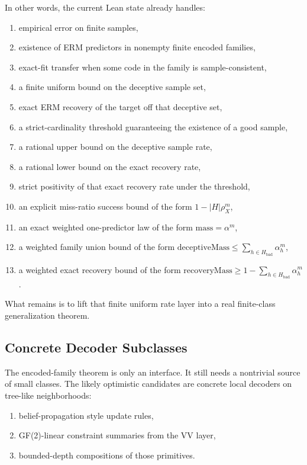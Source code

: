 \documentclass[11pt]{article}
\theoremstyle{remark}
\begin{document}
In other words, the current Lean state already handles:
\begin{enumerate}[leftmargin=1.5em]
  \item empirical error on finite samples,
  \item existence of ERM predictors in nonempty finite encoded families,
  \item exact-fit transfer when some code in the family is sample-consistent,
  \item a finite uniform bound on the deceptive sample set,
  \item exact ERM recovery of the target off that deceptive set,
  \item a strict-cardinality threshold guaranteeing the existence of a good sample,
  \item a rational upper bound on the deceptive sample rate,
  \item a rational lower bound on the exact recovery rate,
  \item strict positivity of that exact recovery rate under the threshold,
  \item an explicit miss-ratio success bound of the form \(1 - |H|\rho_X^m\),
  \item an exact weighted one-predictor law of the form \(\mathrm{mass} = \alpha^m\),
  \item a weighted family union bound of the form
  \(\mathrm{deceptiveMass} \le \sum_{h \in H_{\mathrm{bad}}}\alpha_h^m\),
  \item a weighted exact recovery bound of the form
  \(\mathrm{recoveryMass} \ge 1 - \sum_{h \in H_{\mathrm{bad}}}\alpha_h^m\).
\end{enumerate}

\noindent
What remains is to lift that finite uniform rate layer into a real finite-class
generalization theorem.

\subsection{Concrete Decoder Subclasses}

The encoded-family theorem is only an interface.  It still needs a nontrivial
source of small classes.  The likely optimistic candidates are concrete local
decoders on tree-like neighborhoods:
\begin{enumerate}[leftmargin=1.5em]
  \item belief-propagation style update rules,
  \item GF(2)-linear constraint summaries from the VV layer,
  \item bounded-depth compositions of those primitives.
\end{enumerate}
\end{document}
